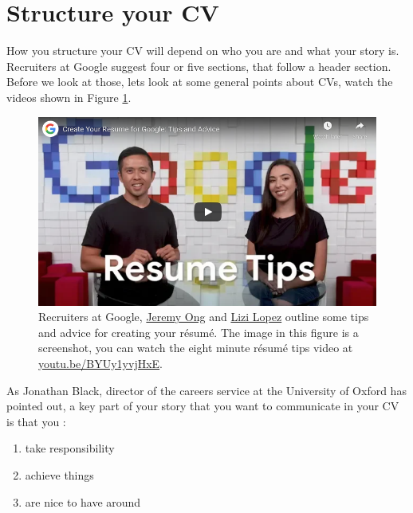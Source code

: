 \documentclass[
]{book}
\providecommand{\tightlist}{%
  \setlength{\itemsep}{0pt}\setlength{\parskip}{0pt}}
\begin{document}
\hypertarget{mycvst}{%
\section{Structure your CV}\label{mycvst}}

How you structure your CV will depend on who you are and what your story is. Recruiters at Google suggest four or five sections, that follow a header section. Before we look at those, lets look at some general points about CVs, watch the videos shown in Figure \ref{fig:lopez-fig}.

\begin{figure}

{\centering \includegraphics[width=0.99\linewidth]{images/youtube-google-recruiters} 

}

\caption{Recruiters at Google, \href{https://www.linkedin.com/in/jeremy-ong/}{Jeremy Ong} and \href{https://www.linkedin.com/in/lizilopez/}{Lizi Lopez} outline some tips and advice for creating your résumé. \citep{youtube-google-recruiters} The image in this figure is a screenshot, you can watch the eight minute résumé tips video at \href{https://youtu.be/BYUy1yvjHxE}{youtu.be/BYUy1yvjHxE}.}\label{fig:lopez-fig}
\end{figure}



As Jonathan Black, director of the careers service at the University of Oxford has pointed out, \citep{topnotchcv} a key part of your story that you want to communicate in your CV is that you :

\begin{enumerate}
\def\labelenumi{\arabic{enumi}.}
\tightlist
\item
  take responsibility
\item
  achieve things
\item
  are nice to have around
\end{enumerate}
\end{document}
